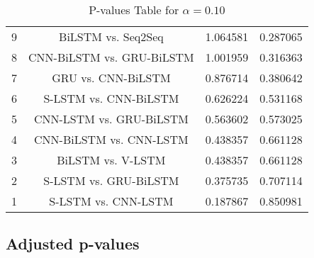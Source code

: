 \documentclass[a4paper,10pt]{article}
\begin{document}
\begin{landscape}
\begin{table}[!htp]
\begin{tabular}{cccc}
9&BiLSTM vs. Seq2Seq&1.064581&0.287065\\
8&CNN-BiLSTM vs. GRU-BiLSTM&1.001959&0.316363\\
7&GRU vs. CNN-BiLSTM&0.876714&0.380642\\
6&S-LSTM vs. CNN-BiLSTM&0.626224&0.531168\\
5&CNN-LSTM vs. GRU-BiLSTM&0.563602&0.573025\\
4&CNN-BiLSTM vs. CNN-LSTM&0.438357&0.661128\\
3&BiLSTM vs. V-LSTM&0.438357&0.661128\\
2&S-LSTM vs. GRU-BiLSTM&0.375735&0.707114\\
1&S-LSTM vs. CNN-LSTM&0.187867&0.850981\\
\hline
\end{tabular}
\caption{P-values Table for $\alpha=0.10$}
\end{table}\pagebreak

\subsection{Adjusted p-values}


\end{landscape}
\end{document}
